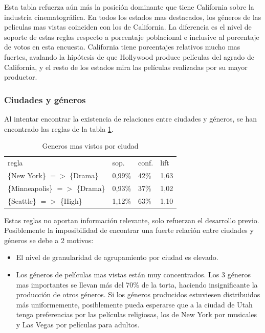 \documentclass[journal]{IEEEtran}
\begin{document}
Esta tabla refuerza aún más la posición dominante que tiene California sobre la industria
cinematográfica. En todos los estados mas destacados, los géneros de 
las peliculas mas vistas coinciden con los de California. La diferencia es el nivel de
soporte de estas reglas respecto a porcentaje poblacional e inclusive al porcentaje de
votos en esta encuesta. California tiene porcentajes relativos mucho mas fuertes, avalando
la hipótesis de que Hollywood produce películas del agrado de California, y el resto de
los estados mira las películas realizadas por su mayor productor.


\subsubsection{Ciudades y géneros}
Al intentar encontrar la existencia de relaciones entre ciudades y géneros, se
han encontrado las reglas de la tabla \ref{citi_genre}.

\begin{table}[ht!]
\caption{Generos mas vistos por ciudad}
\label{citi_genre}
\centering
\begin{tabular}{l l l l }
regla & sop. & conf. & lift \\
\{New York\} $=$$>$ \{Drama\} & 0,99\% & 42\% & 1,63 \\
\{Minneapolis\} $=$$>$ \{Drama\} & 0,93\% & 37\% & 1,02 \\
\{Seattle\} $=$$>$ \{High\} & 1,12\% & 63\% & 1,10 \\
\end{tabular}
\end{table}

Estas reglas no aportan información relevante, solo refuerzan el desarrollo
previo. Posiblemente la imposibilidad de encontrar una fuerte relación entre
ciudades y géneros se debe a 2 motivos:
\begin{itemize}
\item El nivel de granularidad de agrupamiento por ciudad es elevado.
\item Los géneros de películas mas vistas están muy concentrados. Los 3 géneros
mas importantes se llevan más del 70\% de la torta, haciendo insignificante la
producción de otros géneros. Si los géneros producidos estuviesen
distribuidos más uniformemente, 
posiblemente pueda esperarse que a la ciudad de Utah tenga preferencias por las
películas religiosas, los de New York por musicales y Las Vegas por películas 
para adultos.
\end{itemize}
\end{document}
